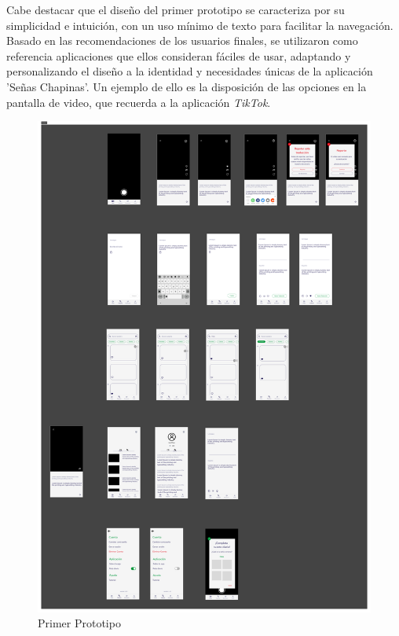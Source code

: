 Cabe destacar que el diseño del primer prototipo se caracteriza por su simplicidad e intuición, con un uso mínimo de texto para facilitar la navegación. Basado en las recomendaciones de los usuarios finales, se utilizaron como referencia aplicaciones que ellos consideran fáciles de usar, adaptando y personalizando el diseño a la identidad y necesidades únicas de la aplicación 'Señas Chapinas'. Un ejemplo de ello es la disposición de las opciones en la pantalla de video, que recuerda a la aplicación \textit{TikTok}.

\begin{figure} [H]
    \centering
    \includegraphics[width=1\linewidth]{figuras/Prototipo1.png}
    \caption{Primer Prototipo}
    \label{fig:primer_prototipo}
\end{figure}

